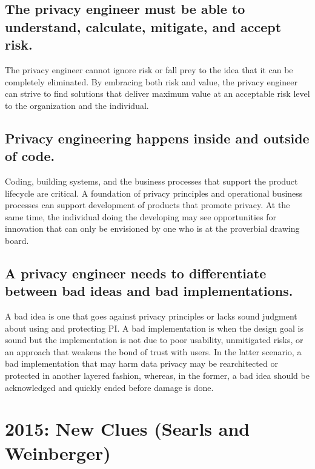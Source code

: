 \documentclass[letterpaper,12pt,english]{sphinxmanual}
\begin{document}
\section{The privacy engineer must be able to understand, calculate, mitigate, and accept risk.}
\label{privacy:the-privacy-engineer-must-be-able-to-understand-calculate-mitigate-and-accept-risk}
The privacy engineer cannot ignore risk or fall prey to the idea that it can be completely eliminated. By embracing both risk and value, the privacy engineer can strive to find solutions that deliver maximum value at an acceptable risk level to the organization and the individual.


\section{Privacy engineering happens inside and outside of code.}
\label{privacy:privacy-engineering-happens-inside-and-outside-of-code}
Coding, building systems, and the business processes that support the product lifecycle are critical. A foundation of privacy principles and operational business processes can support development of products that promote privacy. At the same time, the individual doing the developing may see opportunities for innovation that can only be envisioned by one who is at the proverbial drawing board.


\section{A privacy engineer needs to differentiate between bad ideas and bad implementations.}
\label{privacy:a-privacy-engineer-needs-to-differentiate-between-bad-ideas-and-bad-implementations}
A bad idea is one that goes against privacy principles or lacks sound judgment about using and protecting PI. A bad implementation is when the design goal is sound but the implementation is not due to poor usability, unmitigated risks, or an approach that weakens the bond of trust with users. In the latter scenario, a bad implementation that may harm data privacy may be rearchitected or protected in another layered fashion, whereas, in the former, a bad idea should be acknowledged and quickly ended before damage is done.


\chapter{2015: New Clues (Searls and Weinberger)}
\label{2015newclues:new-clues-searls-and-weinberger}\label{2015newclues::doc}
\end{document}
